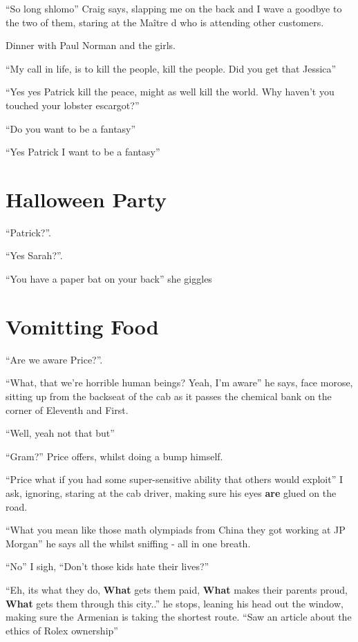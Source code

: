 \documentclass[19pt,openany]{book}
\begin{document}
``So long shlomo'' Craig
says, slapping me on the
back and I wave a goodbye
to the two of them, staring
at the Maître d who is
attending other customers.

Dinner with Paul Norman
and the girls.

``My call in life,
is to kill the people,
kill the people. Did
you get that Jessica''

``Yes yes Patrick kill the peace,
might as well kill the world.
Why haven't you touched your
lobster escargot?''

``Do you want to be a fantasy''

``Yes Patrick I want to be a fantasy''
\chapter{Halloween Party}

``Patrick?''.

``Yes Sarah?''.

``You have a paper bat on your back'' she giggles


\chapter{Vomitting Food}

``Are we aware Price?''.

``What, that we're
horrible human beings?
Yeah, I'm aware'' he
says, face morose, sitting up
from the backseat of the cab
as it passes the chemical bank
on the corner of Eleventh
and First.

``Well, yeah not
that but''

``Gram?'' Price offers,
whilst doing a bump himself.

``Price what if you had
some super-sensitive ability
that others would exploit'' I ask,
ignoring, staring at the cab driver,
making sure his eyes \textbf{are} glued on the road.

``What you mean like those
math olympiads from China they got working at
JP Morgan'' he says
all the whilst sniffing - all in one breath.


``No'' I sigh, ``Don't those
kids hate their lives?''

``Eh, its what they do,
\textbf{What} gets them paid,
\textbf{What} makes
their parents proud, \textbf{What}
gets them through this city..'' he
stops, leaning his head out
the window, making sure the Armenian
is taking
the shortest route. ``Saw
an article about the ethics
of Rolex ownership''
\end{document}
